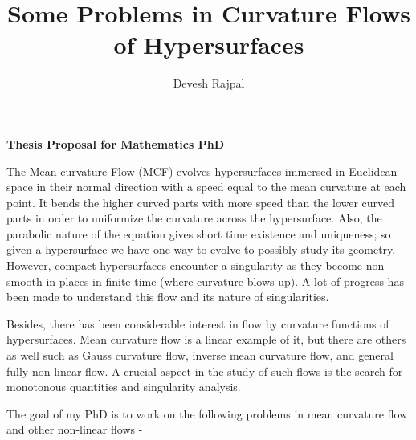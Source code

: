 \documentclass[11pt]{article}
\title{Some Problems in Curvature Flows of Hypersurfaces}
\author{Devesh Rajpal}
\date{}
\begin{document}
\maketitle
\begin{center}
   \textbf{Thesis Proposal for Mathematics PhD} 
\end{center}


The Mean curvature Flow (MCF) evolves hypersurfaces immersed in Euclidean space in their normal direction with a speed equal to the mean curvature at each point. It bends the higher curved parts with more speed than the lower curved parts in order to uniformize the curvature across the hypersurface. Also, the parabolic nature of the equation gives short time existence and uniqueness; so given a hypersurface we have one way to evolve to possibly study its geometry. %
However, compact hypersurfaces encounter a singularity as they become non-smooth in places in finite time (where curvature blows up).
A lot of progress has been made to understand this flow and its nature of singularities.

Besides, there has been considerable interest in flow by curvature functions of hypersurfaces. Mean curvature flow is a linear example of it, but there are others as well such as Gauss curvature flow, inverse mean curvature flow, and general fully non-linear flow. A crucial aspect in the study of such flows is the search for monotonous quantities and singularity analysis. 

The goal of my PhD is to work on the following problems in mean curvature flow and other non-linear flows - 
\end{document}
